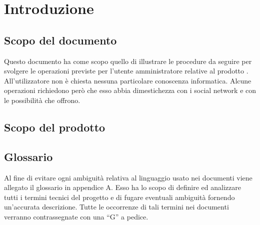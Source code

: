 %


\section{Introduzione} %
\label{sec:introduzione}


	\subsection{Scopo del documento} %
	\label{sub:scopo_del_documento}
		Questo documento ha come scopo quello di illustrare le procedure da seguire per svolgere le operazioni previste per l'utente amministratore relative al prodotto \projectName. All'utilizzatore non è chiesta nessuna particolare conoscenza informatica. Alcune operazioni richiedono però che esso abbia dimestichezza con i social network e con le possibilità che offrono.


	\subsection{Scopo del prodotto} %
	\label{sub:scopo_del_prodotto}
		\productScope


	\subsection{Glossario} %
	\label{sub:glossario}
		Al fine di evitare ogni ambiguità relativa al linguaggio usato nei documenti viene allegato il glossario in appendice A.\newline
		Esso ha lo scopo di definire ed analizzare tutti i termini tecnici del progetto e di fugare eventuali ambiguità fornendo un'accurata descrizione.\newline
		Tutte le occorrenze di tali termini nei documenti verranno contrassegnate con una ``G'' a pedice.


